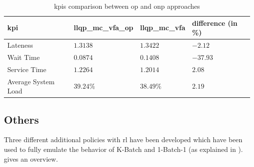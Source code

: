 \documentclass{seal_thesis}
\begin{document}
\begin{table}[!ht]
\centering
\begin{tabular}{@{}llll@{}}
\toprule
\gls{kpi}                 & llqp\_mc\_vfa\_op & llqp\_mc\_vfa & difference (in \%) \\ \midrule
Lateness            & $1.3138$                  & $1.3422$              & $-2.12$                   \\
Wait Time           & $0.0874$                  & $0.1408$              & $-37.93$                   \\
Service Time        & $1.2264$                  & $1.2014$              & $2.08$                   \\
Average System Load & $39.24\%$                  & $38.49\%$              & $2.19$                   \\ \bottomrule
\end{tabular}
\caption{\glspl{kpi} comparison between \gls{op} and \gls{onp} approaches}
\label{tab:llqp_mc_vfa_op_vs_on}
\end{table}

\subsection{Others}
\label{subsec:rl_others}

Three different additional policies with \gls{rl} have been developed which have been used to fully emulate the behavior of K-Batch and 1-Batch-1 (as explained in ).  gives an overview.

\begin{table}[!ht]
\centering
{}
\caption{Overview of additional developed policies with \gls{rl}}
\label{tab:rl_others_policies_overview}
\end{table}
\end{document}
